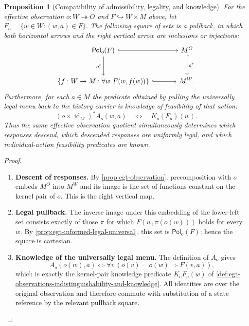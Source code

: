\documentclass[11pt,a4paper]{article}
\numberwithin{equation}{section}
\newtheorem{proposition}[theorem]{Proposition}
\theoremstyle{definition}
\theoremstyle{remark}
\theoremstyle{plain}
\providecommand{\id}{\mathop{\mathrm{id}}}
\begin{document}
\begin{proposition}[Compatibility of admissibility, legality, and knowledge]
\label{prop:egt-uniform-knowledge-square}
For the effective observation $o:W\twoheadrightarrow O$ and
$F\hookrightarrow W\times M$ above, let
$F_a=\{w\in W:(w,a)\in F\}$. The following square of sets is a
pullback, in which both horizontal arrows and the right vertical arrow
are inclusions or injections:
\[
\begin{tikzcd}[column sep=large,row sep=large]
\mathsf{Pol}_o(F)\arrow[r,hook]\arrow[d,"o^*"']
  &M^O\arrow[d,"o^*",hook]\\
\{f:W\to M:\forall w\ F(w,f(w))\}\arrow[r,hook]
  &M^W.
\end{tikzcd}
\]
Furthermore, for each $a\in M$ the predicate obtained by pulling the
universally legal menu back to the history carrier is knowledge of
feasibility of that action:
\[
 (o\times\id_M)^*A_o(w,a)
 \quad\Longleftrightarrow\quad K_o(F_a)(w).
\]
Thus the same effective observation quotient simultaneously determines
which responses descend, which descended responses are uniformly legal,
and which individual-action feasibility predicates are known.
\end{proposition}
\begin{proof}
\leavevmode
\begin{enumerate}[label=\textup{(\arabic*)},leftmargin=*,itemsep=4pt,topsep=3pt]
  \item \textbf{Descent of responses.} By
\cref{prop:egt-observation}, precomposition with $o$ embeds $M^O$
into $M^W$ and its image is the set of functions constant on the
kernel pair of $o$. This is the right vertical map.
  \item \textbf{Legal pullback.} The inverse image under this embedding of
the lower-left set consists exactly of those $\pi$ for which
$F(w,\pi(o(w)))$ holds for every $w$. By
\cref{prop:egt-informed-legal-universal}, this set is
$\mathsf{Pol}_o(F)$; hence the square is cartesian.
  \item \textbf{Knowledge of the universally legal menu.} The definition
of $A_o$ gives
\[
 A_o(o(w),a)\iff
 \forall v\,(o(v)=o(w)\Rightarrow F(v,a)),
\]
which is exactly the kernel-pair knowledge predicate
$K_oF_a(w)$ of \cref{def:egt-observations-indistinguishability-and-knowledge}.
All identities are over the original observation and therefore commute
with substitution of a state reference by the relevant pullback square.
\end{enumerate}
\end{proof}
\end{document}

